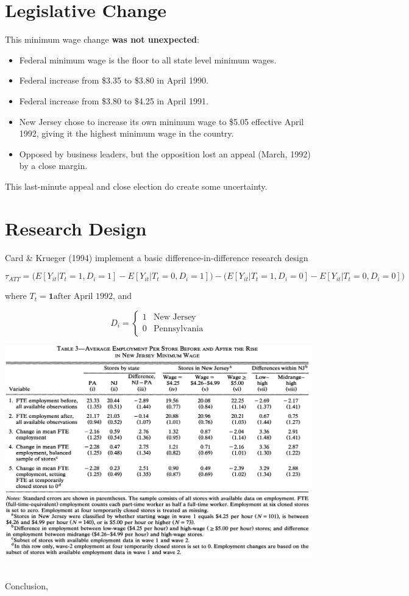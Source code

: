 \documentclass[
  letterpaper,
  DIV=11,
  numbers=noendperiod]{scrreprt}
\providecommand{\tightlist}{%
  \setlength{\itemsep}{0pt}\setlength{\parskip}{0pt}}\usepackage{longtable,booktabs,array}
\theoremstyle{definition}
\theoremstyle{remark}
\begin{document}
\begin{enumerate}
  \section{Legislative Change}\label{legislative-change}

  This minimum wage change \textbf{was not unexpected}:

  \begin{itemize}
  \tightlist
  \item
    Federal minimum wage is the floor to all state level minimum wages.
  \item
    Federal increase from \$3.35 to \$3.80 in April 1990.
  \item
    Federal increase from \$3.80 to \$4.25 in April 1991.
  \item
    New Jersey chose to increase its own minimum wage to \$5.05
    effective April 1992, giving it the highest minimum wage in the
    country.
  \item
    Opposed by business leaders, but the opposition lost an appeal
    (March, 1992) by a close margin.
  \end{itemize}

  This last-minute appeal and close election do create some uncertainty.

  \section{Research Design}\label{research-design}

  Card \& Krueger (1994) implement a basic difference-in-difference
  research design

  \[
  \tau_{ATT} = \big(E[Y_{it}|T_t=1,D_i=1] - E[Y_{it}|T_t=0,D_i=1]\big) - \big(E[Y_{it}|T_t=1,D_i=0] - E[Y_{it}|T_t=0,D_i=0]\big)
  \]

  where \(T_t = \mathbf{1}{\text{after April 1992}}\), and

  \[
  D_i = 
  \begin{cases}
  1 & \text{New Jersey} \\
  0 & \text{Pennsylvania}
  \end{cases}
  \]

  \includegraphics{docs/images/diff-card-krueger-1994-tab3.png}\\
  \strut \\
  Conclusion,


\end{enumerate}
\end{document}
